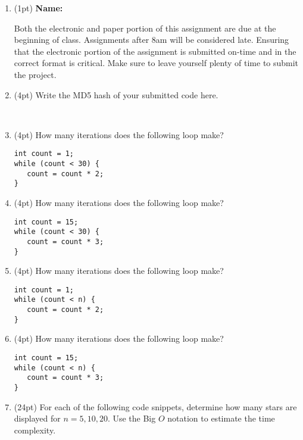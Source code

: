 \documentclass{article}
\newcommand{\pts}[1]{\addtocounter{points}{#1}(#1pt)}
\newcommand{\anspace}{
  \underline{\hspace*{1in}}
}
\begin{document}
\begin{spacing}{1.1}

\begin{enumerate}[leftmargin=*]
\item \pts{1} \textbf{Name:} \hrulefill %

Both the electronic and paper portion of this assignment are due at the
beginning of class.  Assignments after 8am will be considered late.
Ensuring that the electronic portion of the assignment is submitted
on-time and in the correct format is critical.  Make sure to leave
yourself plenty of time to submit the project.

\item \pts{4} Write the MD5 hash of your submitted code
  here. \hrulefill %

~

\item \pts{4} How many iterations does the following loop make? \anspace

\begin{lstlisting} 
int count = 1;
while (count < 30) {
   count = count * 2;
}
\end{lstlisting}

\item \pts{4} How many iterations does the following loop make? \anspace

\begin{lstlisting}
int count = 15;
while (count < 30) {
   count = count * 3;
}
\end{lstlisting}

\item \pts{4} How many iterations does the following loop make? \anspace

\begin{lstlisting}
int count = 1;
while (count < n) {
   count = count * 2;
}
\end{lstlisting}

\item \pts{4} How many iterations does the following loop make? \anspace

\begin{lstlisting}
int count = 15;
while (count < n) {
   count = count * 3;
}
\end{lstlisting}

\item \pts{24} For each of the following code snippets, determine how many
  stars are displayed for $n=5,10,20$.  Use the Big $O$ notation to
  estimate the time complexity.


\end{enumerate}
\end{spacing}
\end{document}
